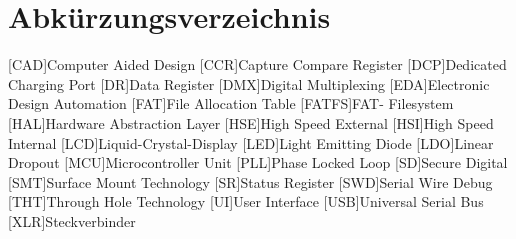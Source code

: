 \section*{Abkürzungsverzeichnis}
\begin{acronym}[main]
	[CAD]{Computer Aided Design}
	[CCR]{Capture Compare Register}
	[DCP]{Dedicated Charging Port}
	[DR]{Data Register}
	[DMX]{Digital Multiplexing}
	[EDA]{Electronic Design Automation}
	[FAT]{File Allocation Table}
	[FATFS]{FAT- Filesystem}
	[HAL]{Hardware Abstraction Layer}
	[HSE]{High Speed External}
	[HSI]{High Speed Internal}
	[LCD]{Liquid-Crystal-Display}
	[LED]{Light Emitting Diode}
	[LDO]{Linear Dropout}
	[MCU]{Microcontroller Unit}
	[PLL]{Phase Locked Loop}
	[SD]{Secure Digital}
	[SMT]{Surface Mount Technology}
	[SR]{Status Register}
	[SWD]{Serial Wire Debug}
	[THT]{Through Hole Technology}
	[UI]{User Interface}
	[USB]{Universal Serial Bus}
	[XLR]{Steckverbinder}
\end{acronym}